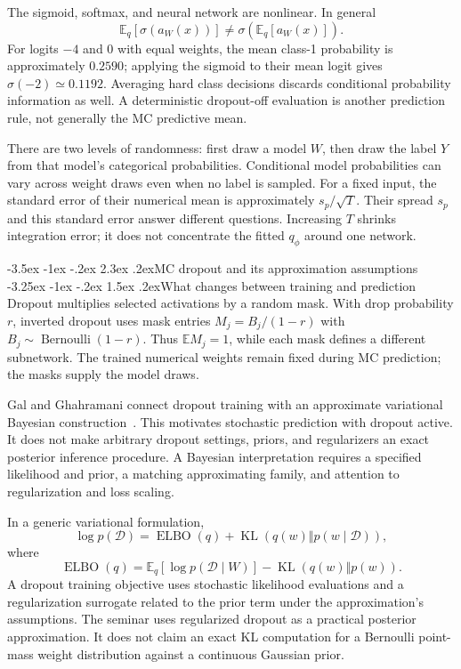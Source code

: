 \documentclass[11pt,a4paper]{article}
\makeatletter
\newcommand{\E}{\mathbb E}
\newcommand{\KL}{\operatorname{KL}}
\renewcommand\section{\@startsection{section}{1}{\z@}%
  {-3.5ex \@plus -1ex \@minus -.2ex}%
  {2.3ex \@plus .2ex}{\normalfont\Large}}
\renewcommand\subsection{\@startsection{subsection}{2}{\z@}%
  {-3.25ex \@plus -1ex \@minus -.2ex}%
  {1.5ex \@plus .2ex}{\normalfont\large}}
\makeatother
\begin{document}
The sigmoid, softmax, and neural network are nonlinear. In general
\[
 \E_q[\sigma(a_W(x))]\ne\sigma(\E_q[a_W(x)]).
\]
For logits $-4$ and $0$ with equal weights, the mean class-1 probability is
approximately $0.2590$; applying the sigmoid to their mean logit gives
$\sigma(-2)\simeq0.1192$. Averaging hard class decisions discards conditional
probability information as well. A deterministic dropout-off evaluation is
another prediction rule, not generally the MC predictive mean.

There are two levels of randomness: first draw a model $W$, then draw the
label $Y$ from that model's categorical probabilities. Conditional model
probabilities can vary across weight draws even when no label is sampled.
For a fixed input, the standard error of their numerical mean is approximately
$s_p/\sqrt T$. Their spread $s_p$ and this standard error answer different
questions. Increasing $T$ shrinks integration error; it does not concentrate
the fitted $q_\phi$ around one network.

\section{MC dropout and its approximation assumptions}
\subsection{What changes between training and prediction}
Dropout multiplies selected activations by a random mask. With drop probability
$r$, inverted dropout uses mask entries $M_j=B_j/(1-r)$ with
$B_j\sim\operatorname{Bernoulli}(1-r)$. Thus $\E M_j=1$, while each mask
defines a different subnetwork. The trained numerical weights remain fixed
during MC prediction; the masks supply the model draws.

Gal and Ghahramani connect dropout training with an approximate variational
Bayesian construction~\cite{gal2016}. This motivates stochastic prediction
with dropout active. It does not make arbitrary dropout settings, priors,
and regularizers an exact posterior inference procedure. A Bayesian
interpretation requires a specified likelihood and prior, a matching
approximating family, and attention to regularization and loss scaling.

In a generic variational formulation,
\[
 \log p(\mathcal D)=\operatorname{ELBO}(q)
              +\KL(q(w)\Vert p(w\mid\mathcal D)),
\]
where
\[
 \operatorname{ELBO}(q)=\E_q[\log p(\mathcal D\mid W)]
                         -\KL(q(w)\Vert p(w)).
\]
A dropout training objective uses stochastic likelihood evaluations and a
regularization surrogate related to the prior term under the approximation's
assumptions. The seminar uses regularized dropout as a practical posterior
approximation. It does not claim an exact KL computation for a Bernoulli
point-mass weight distribution against a continuous Gaussian prior.
\end{document}

